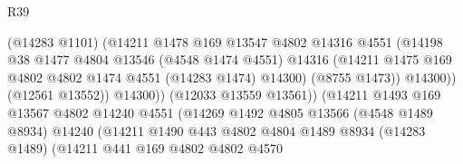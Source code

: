\begin{lexlean}{R39}
\begin{coremodule}
                                        (@14283 @1101)
                                        (@14211
                                          @1478
                                          @169
                                          @13547
                                          @4802
                                          @14316
                                          @4551
                                          (@14198
                                            @38
                                            @1477
                                            @4804
                                            @13546
                                            (@4548 @1474 @4551)
                                            @14316
                                            (@14211
                                              @1475
                                              @169
                                              @4802
                                              @4802
                                              @1474
                                              @4551
                                              (@14283 @1474)
                                              @14300)
                                            (@8755 @1473))
                                          @14300))
                                      (@12561 @13552))
                                    @14300))
                                (@12033 @13559 @13561))
                              (@14211
                                @1493
                                @169
                                @13567
                                @4802
                                @14240
                                @4551
                                (@14269
                                  @1492
                                  @4805
                                  @13566
                                  (@4548 @1489 @8934)
                                  @14240
                                  (@14211
                                    @1490
                                    @443
                                    @4802
                                    @4804
                                    @1489
                                    @8934
                                    (@14283 @1489)
                                    (@14211
                                      @441
                                      @169
                                      @4802
                                      @4802
                                      @4570

\end{coremodule}
\end{lexlean}
